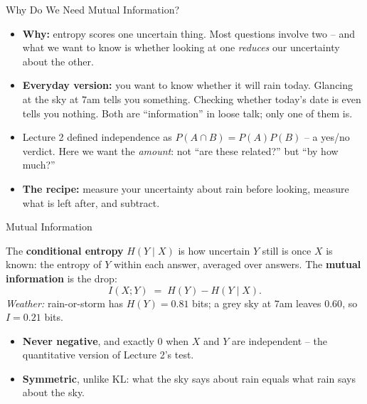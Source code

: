 \begin{frame}{Why Do We Need Mutual Information?}
\begin{itemize}
  \item \textbf{Why:} entropy scores one uncertain thing. Most questions involve two -- and what we want to know is whether looking at one \emph{reduces} our uncertainty about the other.
  \pause
  \item \textbf{Everyday version:} you want to know whether it will rain today. Glancing at the sky at $7$am tells you something. Checking whether today's date is even tells you nothing. Both are ``information'' in loose talk; only one of them is.
  \pause
  \item Lecture 2 defined independence as $P(A \cap B) = P(A)P(B)$ -- a yes/no verdict. Here we want the \emph{amount}: not ``are these related?'' but ``by how much?''
  \pause
  \item \textbf{The recipe:} measure your uncertainty about rain before looking, measure what is left after, and subtract.
\end{itemize}
\end{frame}

\begin{frame}{Mutual Information}
\begin{rldefinition}
The \textbf{conditional entropy} $H(Y \mid X)$ is how uncertain $Y$ still is once $X$ is known: the entropy of $Y$ within each answer, averaged over answers. The \textbf{mutual information} is the drop:
\[
I(X; Y) \;=\; H(Y) - H(Y \mid X) .
\]
\emph{Weather:} rain-or-storm has $H(Y) = 0.81$ bits; a grey sky at $7$am leaves $0.60$, so $I = 0.21$ bits.
\end{rldefinition}
\pause
\begin{itemize}
  \item \textbf{Never negative}, and exactly $0$ when $X$ and $Y$ are independent -- the quantitative version of Lecture 2's test.
  \pause
  \item \textbf{Symmetric}, unlike KL: what the sky says about rain equals what rain says about the sky.
\end{itemize}
\end{frame}

